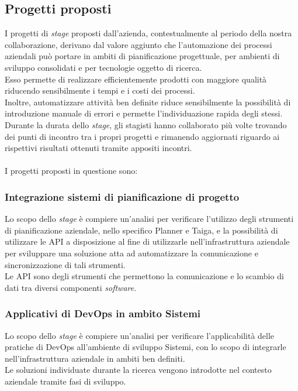\subsection{Progetti proposti}
I progetti di \emph{stage} proposti dall'azienda, contestualmente al periodo della nostra collaborazione, derivano dal valore aggiunto che l'automazione dei processi aziendali può portare in ambiti di pianificazione progettuale, per ambienti di sviluppo consolidati e per tecnologie oggetto di ricerca.\\
Esso permette di realizzare efficientemente prodotti con maggiore qualità riducendo sensibilmente i tempi e i costi dei processi.\\
Inoltre, automatizzare attività ben definite riduce sensibilmente la possibilità di introduzione manuale di errori e permette l'individuazione rapida degli stessi.\\
Durante la durata dello \emph{stage}, gli stagisti hanno collaborato più volte trovando dei punti di incontro tra i propri progetti e rimanendo aggiornati riguardo ai rispettivi risultati ottenuti tramite appositi incontri.\\\\
I progetti proposti in questione sono: 

\subsubsection*{Integrazione sistemi di pianificazione di progetto}
Lo scopo dello \emph{stage} è compiere un'analisi per verificare l'utilizzo degli strumenti di pianificazione aziendale, nello specifico Planner e Taiga, e la possibilità di utilizzare le \gls{API} a disposizione al fine di utilizzarle nell'infrastruttura aziendale per sviluppare una soluzione atta ad automatizzare la comunicazione e sincronizzazione di tali strumenti.\\
Le \gls{API} sono degli strumenti che permettono la comunicazione e lo scambio di dati tra diversi componenti \emph{software}.

\subsubsection*{Applicativi di \gls{DevOps} in ambito Sistemi}
\label{stageDavide}
Lo scopo dello \emph{stage} è compiere un'analisi per verificare l'applicabilità delle pratiche di \gls{DevOps} all'ambiente di sviluppo \gls{Sistemi}, con lo scopo di integrarle nell'infrastruttura aziendale in ambiti ben definiti.\\
Le soluzioni individuate durante la ricerca vengono introdotte nel contesto aziendale tramite fasi di sviluppo. 
 
